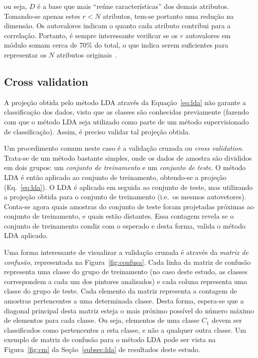 \noindent ou seja, $D$ é a base que mais ``reúne características'' dos demais
atributos. Tomando-se apenas estes $r < N$ atributos, tem-se portanto uma
redução na dimensão. Os autovalores indicam o quanto cada
atributo contribui para a correlação. Portanto, é sempre interessante verificar se
os $r$ autovalores em módulo somam cerca de $70\%$ do total, o que indica
serem suficientes para representar os $N$ atributos originais~\cite{luciano}.

\subsection{Cross validation}

A projeção obtida pelo método LDA através da Equação~\ref{eq:lda} não
garante a classificação dos dados, visto que as classes são conhecidas
previamente (fazendo com que o método LDA seja utilizado como parte de
um método supervisionado de classificação). Assim, é preciso validar
tal projeção obtida.

Um procedimento comum neste caso é a validação cruzada ou
\textit{cross validation}. Trata-se de um método bastante simples,
onde os dados de amostra são divididos em dois grupos: um
\emph{conjunto de treinamento} e um \emph{conjunto de teste}. O método
LDA é então aplicado ao conjunto de treinamento, obtendo-se a projeção
(Eq.~\ref{eq:lda}). O LDA é aplicado em seguida ao conjunto de teste,
mas utilizando a projeção obtida para o conjunto de treinamento
(i.e.\ os mesmos autovetores). Conta-se agora quais amostras do
conjunto de teste foram projetadas próximas ao conjunto de
treinamento, e quais estão distantes. Essa contagem revela se o
conjunto de treinamento condiz com o esperado e desta forma, valida o
método LDA aplicado.

Uma forma interessante de visualizar a validação cruzada é através da
\emph{matriz de confusão}, representada na
Figura~\ref{fig:confusa}. Cada linha da matriz de confusão representa
uma classe do grupo de treinamento (no caso deste estudo, as
classes correspondem a cada um dos pintores analisados) e cada coluna
representa uma classe do grupo de teste. Cada elemento da matriz
representa a contagem de amostras pertencentes a uma determinada
classe. Desta forma, espera-se que a diagonal principal desta matriz
esteja o mais próximo possível do número máximo de elementos para
cada classe. Ou seja, elementos de uma classe $C_1$ devem ser
classificados como pertencentes a esta classe, e não a qualquer outra
classe. Um exemplo de matriz de confusão para o método LDA pode ser
vista na Figura~\ref{fig:cm} da Seção~\ref{subsec:lda} de resultados deste
estudo.

